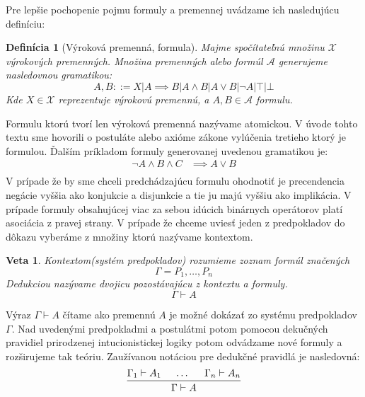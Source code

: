 \documentclass[a4paper,10pt,oneside]{report}%
\newtheorem{theorem}{Veta}[chapter]
\newtheorem{definition}{Definícia}[chapter]
\begin{document}
    Pre lepšie pochopenie pojmu formuly a premennej uvádzame ich nasledujúcu definíciu:
\begin{definition}[Výroková premenná, formula]
    Majme spočítateľnú množinu $\mathcal{X}$ výrokových premenných. Množina premenných
    alebo formúl $\mathcal{A}$ generujeme nasledovnou gramatikou:
    \begin{equation}
        A, B ::= X | A \implies B | A \wedge B | A \vee B | \neg A | \top | \bot
    \end{equation}
    Kde $X \in \mathcal{X}$ reprezentuje výrokovú premennú, a $A, B \in \mathcal{A}$
    formulu.
\end{definition}
    Formulu ktorú tvorí len výroková premenná nazývame atomickou.
    V úvode tohto textu sme hovorili o postuláte alebo axióme zákone vylúčenia
tretieho ktorý je formulou.
    Ďalším príkladom formuly generovanej uvedenou gramatikou je:
\begin{align*}
    \neg A \wedge B \wedge C &\implies A \vee B \\
\end{align*}
    V prípade že by sme chceli predchádzajúcu formulu ohodnotiť je precendencia
negácie vyššia ako konjukcie a disjunkcie a tie ju majú vyššiu ako implikácia.
V prípade formuly obsahujúcej viac za sebou idúcich binárnych operátorov platí asociácia
z pravej strany.
    V prípade že chceme uviesť jeden z predpokladov do dôkazu vyberáme z množiny
ktorú nazývame kontextom.
\begin{theorem}
    Kontextom(systém predpokladov) rozumieme zoznam formúl značených
    \begin{equation}
        \Gamma = P_{1}, \dots , P_{n}
    \end{equation}
    Dedukciou nazývame dvojicu pozostávajúcu z kontextu a formuly.
    \begin{equation}
        \Gamma \vdash A
    \end{equation}
\end{theorem}
    Výraz $\Gamma \vdash A$ čítame ako premennú $A$ je možné dokázať zo systému 
predpokladov $\Gamma$.
    Nad uvedenými predpokladmi a postulátmi potom pomocou dekučných pravidiel prirodzenej
intucionistickej logiky potom odvádzame nové formuly a rozširujeme tak teóriu.
    Zaužívanou notáciou pre dedukčné pravidlá je nasledovná:
    \begin{equation}
        \begin{prooftree}
            \hypo{\Gamma_{1} \vdash A_{1}}
            \hypo{\dots}
            \hypo{\Gamma_{n} \vdash A_{n}}
            \infer3[]{\Gamma \vdash A}
        \end{prooftree}
    \end{equation}
\end{document}
